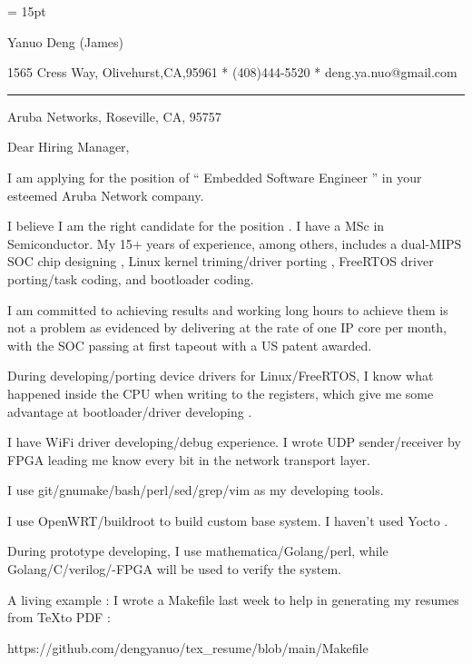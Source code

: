 

  \FFrg \baselineskip = 15pt

{
Yanuo Deng (James)
}

{ 
1565 Cress Way, Olivehurst,CA,95961
*
(408)444-5520
*
deng.ya.nuo@gmail.com
}

{ \smallbreak } 

{\par\noindent\hrule} 

{ \bigbreak } 


Aruba Networks, Roseville, CA, 95757

{ 
Dear Hiring Manager,
}

{ \bigbreak } 
I am applying for the position of `` Embedded Software Engineer '' in your esteemed Aruba Network company.

{ \bigbreak } 
I believe I am the right candidate for the position .
I have a MSc in Semiconductor.
My 15+ years of experience, among others, 
includes a dual-MIPS SOC chip designing ,
Linux kernel triming/driver porting , 
FreeRTOS driver porting/task coding,
and bootloader coding.

{ \bigbreak } 
I am committed to achieving results and working long hours 
to achieve them is not a problem as evidenced by 
delivering at the rate of one IP core per month,
with the SOC passing at first tapeout
with a US patent awarded.

{ \bigbreak } 
During developing/porting device drivers for Linux/FreeRTOS,
I know what happened inside the CPU when writing to the registers,
which give me some advantage at bootloader/driver developing .

{ \bigbreak } 
I have WiFi driver developing/debug experience. 
I wrote UDP sender/receiver by FPGA leading me know every bit in the network transport layer.

{ \bigbreak } 
I use git/gnumake/bash/perl/sed/grep/vim as my developing tools.

{ \bigbreak } 
I use OpenWRT/buildroot to build custom base system. I haven't used Yocto .

{ \bigbreak } 
During prototype developing, I use mathematica/Golang/perl, 
while Golang/C/verilog/-FPGA will be used to verify the system.

{ \bigbreak } 
A living example : I wrote a Makefile last week to help in generating my resumes from \TeX to PDF : 

\centerline{
https://github.com/dengyanuo/tex\_resume/blob/main/Makefile
}

